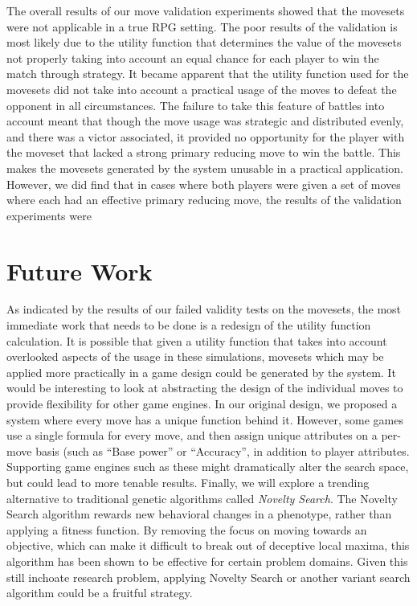 \documentclass{acm_proc_article-sp}
\begin{document}
The overall results of our move validation experiments showed that the movesets were not applicable in a true RPG setting. The poor results of the validation is most likely due to the utility function that determines the value of the movesets not properly taking into account an equal chance for each player to win the match through strategy.  It became apparent that the utility function used for the movesets did not take into account a practical usage of the moves to defeat the opponent in all circumstances. The failure to take this feature of battles into account meant that though the move usage was strategic and distributed evenly, and there was a victor associated, it provided no opportunity for the player with the moveset that lacked a strong primary reducing move to win the battle. This makes the movesets generated by the system unusable in a practical application.
	However, we did find that in cases where both players were given a set of moves where each had an effective primary reducing move, the results of the validation experiments were 

    
    
    \section{Future Work}

As indicated by the results of our failed validity tests on the movesets, the most immediate work that needs to be done is a redesign of the utility function calculation. It is possible that given a utility function that takes into account overlooked aspects of the usage in these simulations, movesets which may be applied more practically in a game design could be generated by the system.
	It would be interesting to look at abstracting the design of the individual moves to provide flexibility for other game engines. In our original design, we proposed a system where every move has a unique function behind it. However, some games use a single formula for every move, and then assign unique attributes on a per-move basis (such as “Base power” or “Accuracy”, in addition to player attributes. Supporting game engines such as these might dramatically alter the search space, but could lead to more tenable results.
	Finally, we will explore a trending alternative to traditional genetic algorithms called \textit{Novelty Search}. The Novelty Search algorithm rewards new behavioral changes in a phenotype, rather than applying a fitness function. By removing the focus on moving towards an objective, which can make it difficult to break out of deceptive local maxima, this algorithm has been shown to be effective for certain problem domains. Given this still inchoate research problem, applying Novelty Search or another variant search algorithm could be a fruitful strategy.
    
\end{document}
